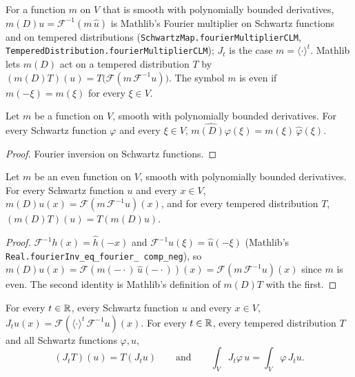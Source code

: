 For a function $m$ on $V$ that is smooth with polynomially bounded derivatives,
$m(D) u = \mathcal F^{-1}(m \, \widehat u)$ is Mathlib's Fourier multiplier on Schwartz functions
and on tempered distributions (\texttt{SchwartzMap.\allowbreak fourier\allowbreak MultiplierCLM},
\texttt{TemperedDistribution.\allowbreak fourier\allowbreak MultiplierCLM}); $J_t$ is the case
$m = \langle \cdot \rangle^t$. Mathlib lets $m(D)$ act on a tempered distribution $T$ by
$(m(D) T)(u) = T\bigl(\mathcal F(m \, \mathcal F^{-1} u)\bigr)$. The symbol $m$ is even if
$m(-\xi) = m(\xi)$ for every $\xi \in V$.

\begin{lemma}
\label{lem:fourier-multiplier-fourier}
\leanok
Let $m$ be a function on $V$, smooth with polynomially bounded derivatives. For every Schwartz
function $\varphi$ and every $\xi \in V$,
$\widehat{m(D) \varphi}(\xi) = m(\xi) \, \widehat\varphi(\xi)$.
\end{lemma}

\begin{proof}
\leanok
Fourier inversion on Schwartz functions.
\end{proof}

\begin{lemma}
\label{lem:even-multiplier-transpose}
\leanok
{}
Let $m$ be an even function on $V$, smooth with polynomially bounded derivatives. For every
Schwartz function $u$ and every $x \in V$,
$m(D) u(x) = \mathcal F(m \, \mathcal F^{-1} u)(x)$, and for every tempered distribution $T$,
$(m(D) T)(u) = T(m(D) u)$.
\end{lemma}

\begin{proof}
\leanok
$\mathcal F^{-1} h(x) = \widehat{h}(-x)$ and $\mathcal F^{-1} u(\xi) = \widehat u(-\xi)$ (Mathlib's
\texttt{Real.\allowbreak fourierInv\_\allowbreak eq\_\allowbreak fourier\_\allowbreak
comp\_\allowbreak neg}), so
$m(D) u(x) = \mathcal F(m(-\cdot) \, \widehat u(-\cdot))(x) = \mathcal F(m \, \mathcal F^{-1} u)(x)$
since $m$ is even. The second identity is Mathlib's definition of $m(D) T$ with the first.
\end{proof}

\begin{lemma}
\label{lem:bessel-potential-transpose}
\leanok
{}
For every $t \in \mathbb{R}$, every Schwartz function $u$ and every $x \in V$,
$J_t u(x) = \mathcal F(\langle \cdot \rangle^t \, \mathcal F^{-1} u)(x)$. For every $t \in \mathbb{R}$,
every tempered distribution $T$ and all Schwartz functions $\varphi, u$,
\[
  (J_t T)(u) = T(J_t u) \qquad \text{and} \qquad
  \int_V J_t \varphi \, u = \int_V \varphi \, J_t u .
\]
\end{lemma}

